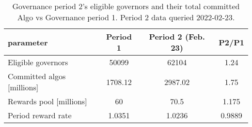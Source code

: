 %
\begin{longtable}[c]{ l c c c }
\caption{Governance period 2's eligible governors and their total committed Algo vs Governance period 1. Period 2 data queried 2022-02-23.} \\
\hline
\textbf{parameter} & \textbf{Period 1} & \textbf{Period 2 (Feb. 23)} & \textbf{P2/P1} \\
\hline

Eligible governors & 50099 & 62104 & 1.24 \\
Committed algos [millions] & 1708.12 & 2987.02 & 1.75 \\
Rewards pool [millions] & 60 & 70.5 & 1.175 \\
Period reward rate & 1.0351 & 1.0236 & 0.9889 \\
\hline
\end{longtable} 
